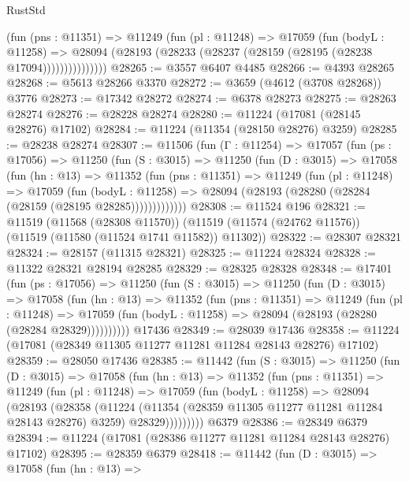 \begin{lexlean}{RustStd}
\begin{coremodule}
                (fun (pns : @11351) =>
                @11249
                  (fun (pl : @11248) =>
                  @17059
                    (fun (bodyL : @11258) =>
                    @28094 (@28193 (@28233 (@28237 (@28159 (@28195 (@28238 @17094)))))))))))))))
@28265 := @3557 @6407 @4485
@28266 := @4393 @28265
@28268 := @5613 @28266 @3370
@28272 := @3659 (@4612 (@3708 @28268)) @3776
@28273 := @17342 @28272
@28274 := @6378 @28273
@28275 := @28263 @28274
@28276 := @28228 @28274
@28280 := @11224 (@17081 (@28145 @28276) @17102)
@28284 := @11224 (@11354 (@28150 @28276) @3259)
@28285 := @28238 @28274
@28307 := @11506
    (fun (Γ : @11254) =>
    @17057
      (fun (ps : @17056) =>
      @11250
        (fun (S : @3015) =>
        @11250
          (fun (D : @3015) =>
          @17058
            (fun (hn : @13) =>
            @11352
              (fun (pns : @11351) =>
              @11249
                (fun (pl : @11248) =>
                @17059
                  (fun (bodyL : @11258) =>
                  @28094 (@28193 (@28280 (@28284 (@28159 (@28195 @28285)))))))))))))
@28308 := @11524 @196
@28321 := @11519
    (@11568 (@28308 @11570))
    (@11519 (@11574 (@24762 @11576)) (@11519 (@11580 (@11524 @1741 @11582)) @11302))
@28322 := @28307 @28321
@28324 := @28157 (@11315 @28321)
@28325 := @11224 @28324
@28328 := @11322 @28321 @28194 @28285
@28329 := @28325 @28328
@28348 := @17401
    (fun (ps : @17056) =>
    @11250
      (fun (S : @3015) =>
      @11250
        (fun (D : @3015) =>
        @17058
          (fun (hn : @13) =>
          @11352
            (fun (pns : @11351) =>
            @11249
              (fun (pl : @11248) =>
              @17059 (fun (bodyL : @11258) => @28094 (@28193 (@28280 (@28284 @28329))))))))))
    @17436
@28349 := @28039 @17436
@28358 := @11224 (@17081 (@28349 @11305 @11277 @11281 @11284 @28143 @28276) @17102)
@28359 := @28050 @17436
@28385 := @11442
    (fun (S : @3015) =>
    @11250
      (fun (D : @3015) =>
      @17058
        (fun (hn : @13) =>
        @11352
          (fun (pns : @11351) =>
          @11249
            (fun (pl : @11248) =>
            @17059
              (fun (bodyL : @11258) =>
              @28094
                (@28193
                  (@28358
                    (@11224
                      (@11354 (@28359 @11305 @11277 @11281 @11284 @28143 @28276) @3259)
                      @28329)))))))))
    @6379
@28386 := @28349 @6379
@28394 := @11224 (@17081 (@28386 @11277 @11281 @11284 @28143 @28276) @17102)
@28395 := @28359 @6379
@28418 := @11442
    (fun (D : @3015) =>
    @17058
      (fun (hn : @13) =>

\end{coremodule}
\end{lexlean}
